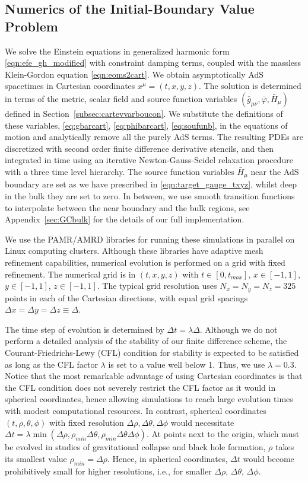 \documentclass[a4paper,11pt]{article}
\numberwithin{equation}{section}
\begin{document}
\subsection{Numerics of the Initial-Boundary Value Problem}
\label{sec:numcauprob}
We solve the Einstein equations in generalized harmonic form \eqref{eqn:efe_gh_modified} with constraint damping terms, coupled with the massless Klein-Gordon equation \eqref{eqn:eoms2cart}.
We obtain asymptotically AdS spacetimes in Cartesian coordinates $x^\mu=(t,x,y,z)$. 
The solution is determined in terms of the metric, scalar field and source function variables $(\bar{g}_{\mu\nu},\bar{\varphi},\bar{H}_\mu)$ defined in Section~\ref{subsec:cartevvarboucon}. We substitute the definitions of these variables, \eqref{eq:gbarcart}, \eqref{eq:phibarcart}, \eqref{eq:soufunb}, in the equations of motion and analytically remove all the purely AdS terms.
The resulting PDEs are discretized with second order finite difference derivative stencils, and then integrated in time using an iterative Newton-Gauss-Seidel relaxation procedure with a three time level hierarchy.
The source function variables $\bar{H}_\mu$ near the AdS boundary are set as we have prescribed in \eqref{eqn:target_gauge_txyz}, whilst deep in the bulk they are set to zero. 
In between, we use smooth transition functions to interpolate between the near boundary and the bulk regions, see Appendix~\ref{sec:GCbulk} for the details of our full implementation. 

We use the PAMR/AMRD libraries \cite{PAMR} for running these simulations in parallel on Linux computing clusters.
Although these libraries have adaptive mesh refinement capabilities, numerical evolution is performed on a grid with fixed refinement.
The numerical grid is in $(t,x,y,z)$ with $t \in [0,t_{max}]$, $x \in [-1,1]$, $y \in [-1,1]$, $z \in [-1,1]$.
The typical grid resolution uses $N_x=N_y=N_z=325$ points in each of the Cartesian directions, with equal grid spacings $\Delta x = \Delta y = \Delta z\equiv \Delta$. 

The time step of evolution is determined by $\Delta t=\lambda \Delta$. 
Although we do not perform a detailed analysis of the stability of our finite difference scheme, the Courant-Friedrichs-Lewy (CFL) condition for stability is expected to be satisfied as long as the CFL factor $\lambda$ is set to a value well below 1. Thus, we use $\lambda=0.3$. Notice that the most remarkable advantage of using Cartesian coordinates is that the CFL condition does not severely restrict the CFL factor as it would in spherical coordinates, hence allowing simulations to reach large evolution times with modest computational resources.
In contrast, spherical coordinates $(t,\rho,\theta,\phi)$ with fixed resolution $\Delta\rho,\Delta\theta,\Delta\phi$ would necessitate $\Delta t = \lambda \min(\Delta\rho, \rho_{min} \Delta\theta, \rho_{min} \Delta\theta \Delta\phi)$.
At points next to the origin, which must be evolved in studies of gravitational collapse and black hole formation, $\rho$ takes its smallest value $\rho_{min}=\Delta\rho$. 
Hence, in spherical coordinates, $\Delta t$ would become prohibitively small for higher resolutions, i.e., for smaller $\Delta\rho$, $\Delta\theta$, $\Delta\phi$.
\end{document}
